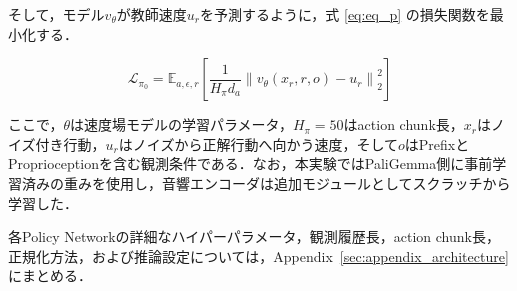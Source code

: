 \documentclass{article}
\begin{document}
	そして，モデル$v_\theta$が教師速度$u_r$を予測するように，式 \ref{eq:eq_p} の損失関数を最小化する．

	\begin{equation}
	\label{eq:eq_p}
	\mathcal{L}_{\pi_0} =\mathbb{E}_{a,\epsilon,r} \left[\frac{1}{H_\pi d_a}\left\|v_\theta(x_r,r,o)-u_r\right\|_2^2\right]
	\end{equation}

	ここで，$\theta$は速度場モデルの学習パラメータ，$H_\pi=50$はaction chunk長，$x_r$はノイズ付き行動，$u_r$はノイズから正解行動へ向かう速度，そして$o$はPrefixとProprioceptionを含む観測条件である．なお，本実験ではPaliGemma側に事前学習済みの重みを使用し，音響エンコーダは追加モジュールとしてスクラッチから学習した．

	各Policy Networkの詳細なハイパーパラメータ，観測履歴長，action chunk長，正規化方法，および推論設定については，Appendix~\ref{sec:appendix_architecture}にまとめる．










\end{document}
